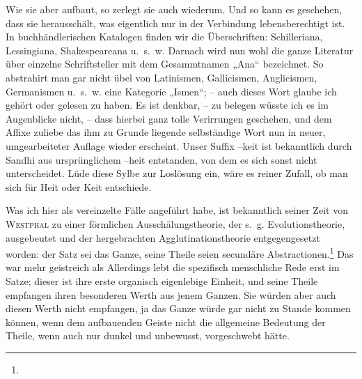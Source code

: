 {Wie sie aber aufbaut, so zerlegt sie auch wiederum. Und so kann es geschehen, dass sie herausschält, was eigentlich nur in der Verbindung lebensberechtigt ist. In buchhändlerischen Katalogen finden wir die Überschriften: Schilleriana, Lessingiana, Shakespeareana u.~s.~w. Darnach wird nun wohl die ganze Literatur über einzelne Schriftsteller mit dem Gesammtnamen „Ana“ bezeichnet. So abstrahirt man gar nicht übel von Latinismen, Gallicismen, Anglicismen, Germanismen u.~s.~w. eine Kategorie „Ismen“; – auch dieses Wort glaube ich gehört oder gelesen zu haben. Es ist denkbar, – zu belegen wüsste ich es im Augenblicke nicht, – dass hierbei ganz tolle Verirrungen geschehen, und dem Affixe zuliebe das ihm zu Grunde liegende selbständige Wort nun in \label{sp.216} neuer, umgearbeiteter Auflage wieder erscheint. Unser Suffix –keit ist bekanntlich durch Sandhi aus ursprünglichem –heit entstanden, von dem es sich sonst nicht unterscheidet. Lüde diese Sylbe zur Loslösung ein, wäre es reiner Zufall, ob man sich für Heit oder Keit entschiede.

Was ich hier als vereinzelte Fälle angeführt habe, ist bekanntlich seiner Zeit von \textsc{Westphal} zu einer förmlichen Ausschälungstheorie, der s.~g. Evolutionstheorie, ausgebeutet und der hergebrachten Agglutinationstheorie entgegengesetzt worden: der Satz sei das Ganze, seine Theile seien secundäre Abstractionen.\footnote{} Das war mehr geistreich als  Allerdings lebt die spezifisch menschliche Rede erst im Satze; dieser ist ihre erste organisch eigenlebige Einheit, und seine Theile empfangen ihren besonderen Werth aus jenem Ganzen. Sie würden aber auch diesen Werth nicht empfangen, ja das Ganze würde gar nicht zu Stande kommen können, wenn dem aufbauenden Geiste nicht die allgemeine Bedeutung der Theile, wenn auch nur dunkel und unbewusst, vorgeschwebt hätte.

}
